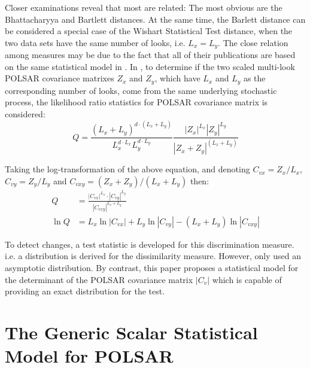 \documentclass[printer]{tRSL2e}
\begin{document}
Closer examinations reveal that most are related:
The most obvious are the Bhattacharyya and Bartlett distances. %
At the same time, the Barlett distance can be considered a special case of the Wishart Statistical Test distance,
  when the two data sets have the same number of looks, i.e. $L_x=L_y$.
The close relation among  measures may be due to the fact that
  all of their publications are based on the same statistical model in \citet{Conradsen_2003_TGRS_4}.
In \citet{Conradsen_2003_TGRS_4}, to determine if the two scaled multi-look POLSAR covariance matrixes $Z_x$ and $Z_y$,
  which have $L_x$ and $L_y$ as the corresponding number of looks,
  come from the same underlying stochastic process,
the likelihood ratio statistics for POLSAR covariance matrix is considered:  
     \vspace{-2mm}
\begin{equation}
  Q = \frac{(L_x+L_y)^{d \cdot (L_x+L_y)}}{L_x^{d \cdot L_x} L_y^{d \cdot L_y}} \frac{|Z_x|^{L_x} |Z_y|^{L_y} }{|Z_x+Z_y|^{(L_x+L_y)}}
\end{equation}

Taking the log-transformation of the above equation, and denoting $C_{vx} = Z_x / L_x$, $C_{vy} = Z_y / L_y$ and $C_{vxy} = (Z_x + Z_y)/(L_x + L_y)$ then:
{\small
\begin{align}
  Q &= \frac{|C_{vx}|^{L_x} \cdot |C_{vy}|^{L_y} }{|C_{vxy}|^{L_x + L_y}} \label{eqn:ori_likelyhood_stats} \\
  \ln Q &= L_x \ln |C_{vx}| + L_y \ln |C_{vy}| - (L_x + L_y) \ln |C_{vxy}| \label{eqn:log_likelyhood_stats}
\end{align}
}
\vspace{-2mm}

To detect changes, a test statistic is developed for this discrimination measure.
i.e. a distribution is derived for the dissimilarity measure.
However, \citet{Conradsen_2003_TGRS_4} only used an asymptotic distribution.
By contrast, this paper proposes a statistical model for the determinant of the POLSAR covariance matrix $|C_v|$
  which is capable of providing an exact distribution for the test.

\section{The Generic Scalar Statistical Model for POLSAR}  
\label{sec:theoretical_model}
\end{document}
